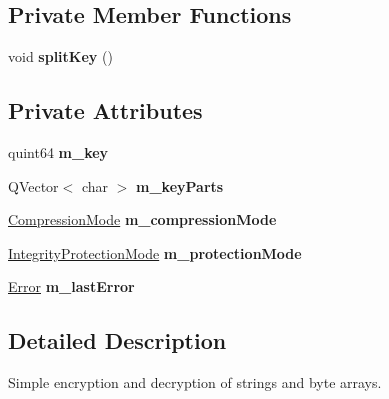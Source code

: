\subsection*{Private Member Functions}
\begin{DoxyCompactItemize}
\item 
\hypertarget{class_simple_crypt_a0c315473b243f7a3f707a2d0fedf61b7}{}void {\bfseries split\+Key} ()\label{class_simple_crypt_a0c315473b243f7a3f707a2d0fedf61b7}

\end{DoxyCompactItemize}
\subsection*{Private Attributes}
\begin{DoxyCompactItemize}
\item 
\hypertarget{class_simple_crypt_aefc99e850635cde7f13fb58e73a338ab}{}quint64 {\bfseries m\+\_\+key}\label{class_simple_crypt_aefc99e850635cde7f13fb58e73a338ab}

\item 
\hypertarget{class_simple_crypt_aac0bcad9eef0d0488ece419ef32c25f9}{}Q\+Vector$<$ char $>$ {\bfseries m\+\_\+key\+Parts}\label{class_simple_crypt_aac0bcad9eef0d0488ece419ef32c25f9}

\item 
\hypertarget{class_simple_crypt_a6d9a5f9ee813f93a40226b27f84043d1}{}\hyperlink{class_simple_crypt_a25298e746f175cf175a18f082092ca8e}{Compression\+Mode} {\bfseries m\+\_\+compression\+Mode}\label{class_simple_crypt_a6d9a5f9ee813f93a40226b27f84043d1}

\item 
\hypertarget{class_simple_crypt_a0fe57e519baf899804281db986bb0f82}{}\hyperlink{class_simple_crypt_a42a5172e558d346b28421cc4e85feb2d}{Integrity\+Protection\+Mode} {\bfseries m\+\_\+protection\+Mode}\label{class_simple_crypt_a0fe57e519baf899804281db986bb0f82}

\item 
\hypertarget{class_simple_crypt_adccf15d36547ce4fe300e011774553ae}{}\hyperlink{class_simple_crypt_ab7f81049e78f021b55a36f7cfac5a09b}{Error} {\bfseries m\+\_\+last\+Error}\label{class_simple_crypt_adccf15d36547ce4fe300e011774553ae}

\end{DoxyCompactItemize}


\subsection{Detailed Description}
Simple encryption and decryption of strings and byte arrays. 

